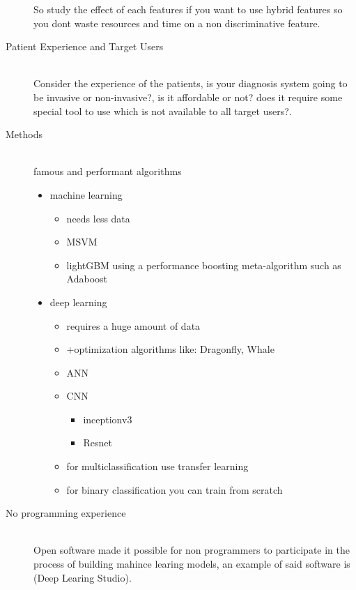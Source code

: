\begin{description}
            So study the effect of each features if you want to use hybrid features so you dont waste resources and time on a non discriminative feature. 
        \item[Patient Experience and Target Users] \hfill \\ 
            Consider the experience of the patients,
            is your diagnosis system going to be invasive or non-invasive?, is it affordable or not? does it require some special tool to use which is not available to all target users?.
        \item[Methods] \hfill \\
            famous and performant algorithms
            \begin{itemize}
            \item machine learning 
                \begin{itemize}
                    \item needs less data
                    \item MSVM
                    \item lightGBM using a performance boosting meta-algorithm such as Adaboost 
                \end{itemize}
            \item deep learning 
                \begin{itemize}
                    \item requires a huge amount of data
                    \item +optimization algorithms like: Dragonfly, Whale
                    \item ANN
                    \item CNN
                    \begin{itemize}
                        \item inceptionv3
                        \item Resnet
                    \end{itemize}
                    \item for multiclassification use transfer learning
                    \item for binary classification you can train from scratch
                \end{itemize}
            \end{itemize}
        \item[No programming experience] \hfill \\
            Open software made it possible for non programmers to participate in the process of building mahince learing models, an example of said software is (Deep Learing Studio).

\end{description}
